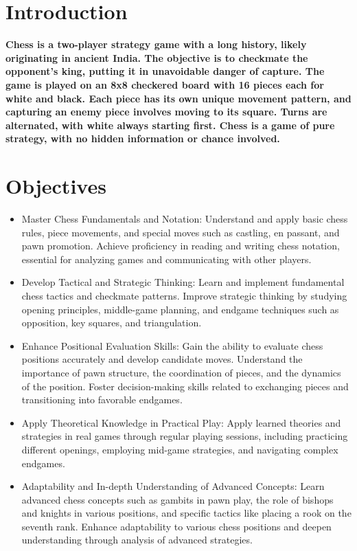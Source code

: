 \documentclass[a4paper,11pt]{article}
\begin{document}
\section{Introduction}
\textbf{Chess is a two-player strategy game with a long history, likely originating in ancient India. The objective is to checkmate the opponent's king, putting it in unavoidable danger of capture. The game is played on an 8x8 checkered board with 16 pieces each for white and black. Each piece has its own unique movement pattern, and capturing an enemy piece involves moving to its square. Turns are alternated, with white always starting first. Chess is a game of pure strategy, with no hidden information or chance involved.}

\section{Objectives}
\begin{itemize}
    \item Master Chess Fundamentals and Notation: Understand and apply basic chess rules, piece movements, and special moves such as castling, en passant, and pawn promotion. Achieve proficiency in reading and writing chess notation, essential for analyzing games and communicating with other players.
    \item Develop Tactical and Strategic Thinking: Learn and implement fundamental chess tactics and checkmate patterns. Improve strategic thinking by studying opening principles, middle-game planning, and endgame techniques such as opposition, key squares, and triangulation.
    \item Enhance Positional Evaluation Skills: Gain the ability to evaluate chess positions accurately and develop candidate moves. Understand the importance of pawn structure, the coordination of pieces, and the dynamics of the position. Foster decision-making skills related to exchanging pieces and transitioning into favorable endgames.
    \item Apply Theoretical Knowledge in Practical Play: Apply learned theories and strategies in real games through regular playing sessions, including practicing different openings, employing mid-game strategies, and navigating complex endgames.
    \item Adaptability and In-depth Understanding of Advanced Concepts: Learn advanced chess concepts such as gambits in pawn play, the role of bishops and knights in various positions, and specific tactics like placing a rook on the seventh rank. Enhance adaptability to various chess positions and deepen understanding through analysis of advanced strategies.
\end{itemize}
\end{document}
